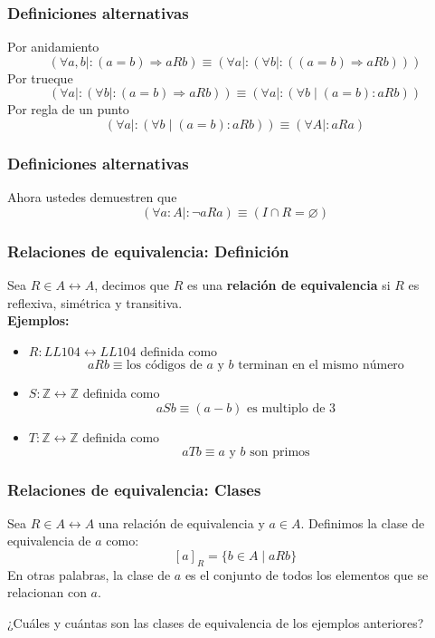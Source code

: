 \documentclass{beamer}
\newcommand{\then}{\Rightarrow}
\begin{document}
\begin{frame}[fragile]
    \frametitle{Definiciones alternativas}
    Por anidamiento
    $$(\forall a, b \mid : (a=b) \then aRb ) \equiv (\forall a \mid : (\forall b \mid : ((a = b) \then aRb)))$$
    Por trueque
    $$(\forall a \mid : (\forall b \mid : (a = b) \then aRb)) \equiv (\forall a \mid : (\forall b \mid (a =  b) : aRb))$$
    Por regla de un punto
    $$(\forall a \mid : (\forall b \mid (a =  b) : aRb)) \equiv (\forall A \mid : aRa)$$
\end{frame}

\begin{frame}[fragile]
    \frametitle{Definiciones alternativas}
    Ahora ustedes demuestren que
    $$(\forall a:A \mid : \lnot aRa) \equiv (I \cap R = \varnothing)$$
    \vspace{160pt}
\end{frame}

\begin{frame}[fragile]
    \frametitle{Relaciones de equivalencia: Definición}
    Sea $R \in A \leftrightarrow A$, decimos que $R$ es una \textbf{relación de equivalencia} si $R$ es reflexiva, simétrica y transitiva.\\
    \textbf{Ejemplos:}
    \begin{itemize}
        \item $R : LL104 \leftrightarrow LL104$ definida como
            $$aRb \equiv \text{los códigos de $a$ y $b$ terminan en el mismo número}$$
        \item $S: \mathbb{Z} \leftrightarrow \mathbb{Z}$ definida como 
            $$aSb \equiv (a - b)\text{ es multiplo de 3}$$ 
        \item $T: \mathbb{Z} \leftrightarrow \mathbb{Z}$ definida como
            $$aTb \equiv \text{$a$ y $b$ son primos}$$
    \end{itemize}
\end{frame}

\begin{frame}[fragile]
    \frametitle{Relaciones de equivalencia: Clases}
    Sea $R \in A \leftrightarrow A$ una relación de equivalencia y $a \in A$.
    Definimos la clase de equivalencia de $a$ como:
    $$[a]_{R} = \{b \in A \mid aRb\}$$
    En otras palabras, la clase de $a$ es el conjunto de todos los elementos que se relacionan con $a$.\\
    \begin{center}
        ¿Cuáles y cuántas son las clases de equivalencia de los ejemplos anteriores?
    \end{center}
\end{frame}
\end{document}
